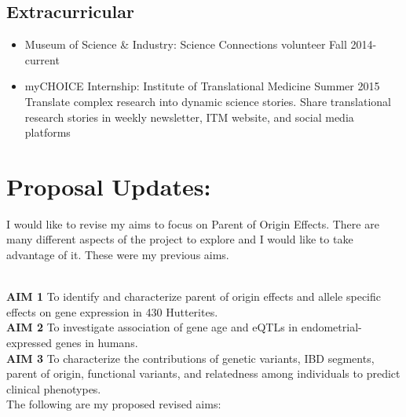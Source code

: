 \documentclass[a4paper, 11pt]{article}
\begin{document}
\subsection*{Extracurricular}
\begin{itemize}
	\item Museum of Science \& Industry: Science Connections volunteer \hfill Fall 2014-current
    \item myCHOICE Internship: Institute of Translational Medicine \hfill Summer 2015\\Translate complex research into dynamic science stories. Share translational research stories in weekly newsletter, ITM website, and social media platforms

\end{itemize}




\newpage

\section*{Proposal Updates:}
I would like to revise my aims to focus on Parent of Origin Effects. There are many different aspects of the project to explore and I would like to take advantage of it. These were my previous aims.

\textbf{\\AIM 1} To identify and characterize parent of origin effects and allele specific effects on gene expression in 430 Hutterites.\\
\textbf{AIM 2} To investigate association of gene age and eQTLs in endometrial-expressed genes in humans.\\
\textbf{AIM 3} To characterize the contributions of genetic variants, IBD segments, parent of origin, functional variants, and relatedness among individuals to predict clinical phenotypes.\\

The following are my proposed revised aims:
\end{document}
